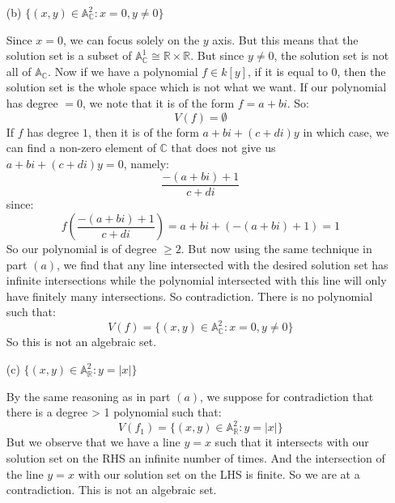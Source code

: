 \documentclass{article}
\begin{document}
\begin{itemize}
        \item [(b)] $\{(x, y) \in \mathbb{A}^{2}_{\mathbb{C}}: x = 0, y \neq 0\}$
            \begin{answer}
                Since $x = 0$, we can focus solely on the $y$ axis. But this means that the solution set is a subset of $\mathbb{A}^{1}_{\mathbb{C}} \cong \mathbb{R} \times \mathbb{R}$. But since $y \neq 0$, the solution set is not all of $\mathbb{A}_{\mathbb{C}}$. Now if we have a polynomial $f \in k[y]$, if it is equal to $0$, then the solution set is the whole space which is not what we want. If our polynomial has degree $ = 0$, we note that it is of the form $f = a + bi$. So:
                    \begin{equation*}
                        V(f) = \emptyset
                    \end{equation*}
                If $f$ has degree $1$, then it is of the form $a + bi + (c + di)y$ in which case, we can find a non-zero element of $\mathbb{C}$ that does not give us $a + bi + (c + di)y = 0$, namely:
                    \begin{equation*}
                        \dfrac{-(a + bi) + 1}{c + di}
                    \end{equation*}
                since:
                    \begin{equation*}
                        f\left(\dfrac{-(a + bi) + 1}{c + di}\right) = a + bi + (-(a + bi) + 1) = 1
                    \end{equation*}
                So our polynomial is of degree $\geq 2$. But now using the same technique in part $(a)$, we find that any line intersected with the desired solution set has infinite intersections while the polynomial intersected with this line will only have finitely many intersections. So contradiction. There is no polynomial such that:
                    \begin{equation*}
                        V(f) = \{(x, y) \in \mathbb{A}^{2}_{\mathbb{C}}: x = 0, y \neq 0\}
                    \end{equation*}
                So this is not an algebraic set.
            \end{answer}

        \item [(c)] $\{(x, y) \in \mathbb{A}_{\mathbb{R}}^{2}: y = \lvert x \rvert\}$
            \begin{answer}
                By the same reasoning as in part $(a)$, we suppose for contradiction that there is a degree > 1 polynomial such that:
                    \begin{equation*}
                        V(f_{1}) = \{(x, y) \in \mathbb{A}_{\mathbb{R}}^{2}: y = \lvert x \rvert\}
                    \end{equation*}
                But we observe that we have a line $y = x$ such that it intersects with our solution set on the RHS an infinite number of times. And the intersection of the line $y = x$ with our solution set on the LHS is finite. So we are at a contradiction. This is not an algebraic set.
            \end{answer}


\end{itemize}
\end{document}
